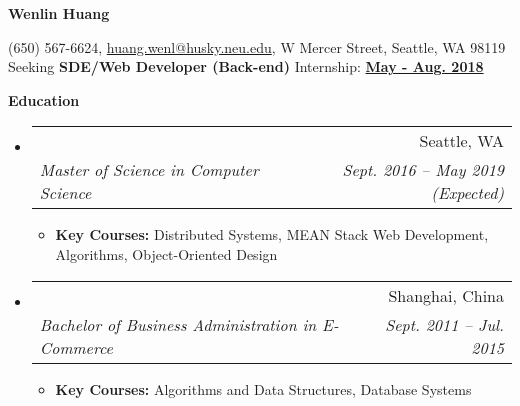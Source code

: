 \documentclass[letterpaper,11pt]{article}
\makeatletter
\newcommand{\resitem}[1]{\item #1 \vspace{-2pt}}
\newcommand{\resheading}[1]{{\large \colorbox{mygrey}{\begin{minipage}{\textwidth}{\textbf{#1 \vphantom{p\^{E}}}}\end{minipage}}}}
\newcommand{\ressubheading}[4]{
\begin{tabular*}{6.5in}{l@{\extracolsep{\fill}}r}
    \textbf{#1} & #2 \\
    \textit{#3} & \textit{#4} \\
\end{tabular*}\vspace{-6pt}}
\makeatother
\begin{document}

    \centering\textbf{\huge Wenlin Huang}\\ \vspace{0.1in}

    (650) 567-6624,
    \href {mailto:huang.wenl@husky.neu.edu} {huang.wenl@husky.neu.edu},
    {W Mercer Street, Seattle, WA 98119} \\

    {Seeking
    \textbf{SDE/Web Developer ({Back-end})} Internship:
    \textbf{\underline{May - Aug. 2018}}}



    \resheading{Education}
    \begin{itemize}
        \item[]
        \ressubheading  %
        {\href
        {http://www.northeastern.edu/seattle/}
        {Northeastern University - Seattle}
        }
        {Seattle, WA}
        {Master of Science in Computer Science}
        {Sept. 2016 -- May 2019 (Expected)}
        {\footnotesize
        \begin{itemize}
            \resitem{
            \textbf{Key Courses:} Distributed Systems, MEAN Stack Web Development,
            Algorithms, Object-Oriented Design
            }
        \end{itemize}
        }

        \item[]
        \ressubheading
        {\href
        {http://www.shnu.edu.cn/}
        {Shanghai Normal University}
        }
        {Shanghai, China}
        {Bachelor of Business Administration in E-Commerce}
        {Sept. 2011 -- Jul. 2015}
        {
        \footnotesize
        \begin{itemize}
            \resitem{
            \textbf{Key Courses:} Algorithms and Data Structures, Database Systems
            }
        \end{itemize}
        }

    \end{itemize}
\end{document}
